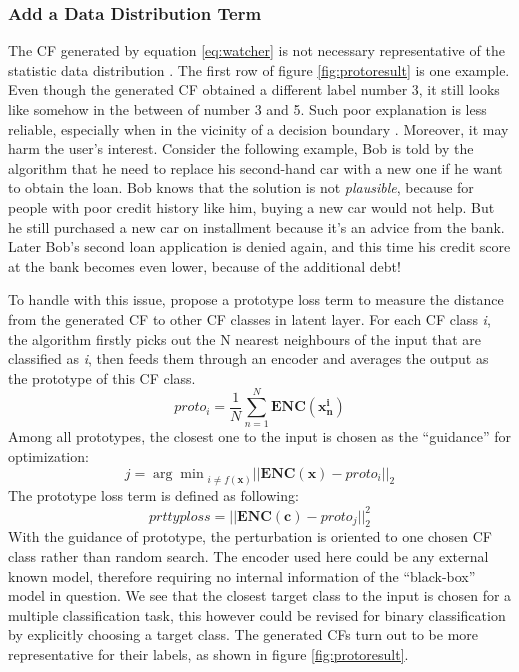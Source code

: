 \subsubsection{Add a Data Distribution Term}
The CF generated by equation \ref{eq:watcher} is not necessary representative of the statistic data distribution \cite{FACE}. The first row of figure \ref{fig:protoresult} is one example. Even though the generated CF obtained a different label number 3, it still looks like somehow in the between of number 3 and 5. Such poor explanation is less reliable, especially when in the vicinity of a decision boundary \cite{FACE}. Moreover, it may harm the user's interest. Consider the following example, Bob is told by the algorithm that he need to replace his second-hand car with a new one if he want to obtain the loan. Bob knows that the solution is not \emph{plausible}, because for people with poor credit history like him, buying a new car would not help. But he still purchased a new car on installment because it's an advice from the bank. Later Bob's second loan application is denied again, and this time his credit score at the bank becomes even lower, because of the additional debt!
 
To handle with this issue, \citeauthor{prototype} \cite{prototype} propose a prototype loss term to measure the distance from the generated CF to other CF classes in latent layer. For each CF class \emph{i}, the algorithm firstly picks out the N nearest neighbours of the input that are classified as \emph{i}, then feeds them through an encoder and averages the output as the prototype of this CF class.
\begin{equation}\label{eq:prototype}
  proto_i=\frac{1}{N}\sum_{n=1}^{N}\mathbf{ENC}(\mathbf{x_n^i})
\end{equation}
Among all prototypes, the closest one to the input is chosen as the ``guidance'' for optimization:
\begin{equation}\label{eq:closestProto}
  j = {\arg\min}_{i\neq f(\textbf{x})}||\mathbf{ENC}(\textbf{x})-proto_i||_2
\end{equation}
The prototype loss term is defined as following:
\begin{equation}\label{eq:protoloss}
  prttyploss=||\mathbf{ENC}(\textbf{c})-proto_j||_2^2
\end{equation}
With the guidance of prototype, the perturbation is oriented to one chosen CF class rather than random search. The encoder used here could be any external known model, therefore requiring no internal information of the ``black-box'' model in question. We see that the closest target class to the input is chosen for a multiple classification task, this however could be revised for binary classification by explicitly choosing a target class. The generated CFs turn out to be more representative for their labels, as shown in figure \ref{fig:protoresult}.

